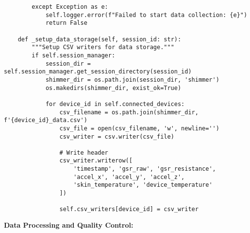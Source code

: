 \documentclass[12pt,a4paper]{article}
\begin{document}
\begin{verbatim}
        except Exception as e:
            self.logger.error(f"Failed to start data collection: {e}")
            return False
    
    def _setup_data_storage(self, session_id: str):
        """Setup CSV writers for data storage."""
        if self.session_manager:
            session_dir = self.session_manager.get_session_directory(session_id)
            shimmer_dir = os.path.join(session_dir, 'shimmer')
            os.makedirs(shimmer_dir, exist_ok=True)
            
            for device_id in self.connected_devices:
                csv_filename = os.path.join(shimmer_dir, f'{device_id}_data.csv')
                csv_file = open(csv_filename, 'w', newline='')
                csv_writer = csv.writer(csv_file)
                
                # Write header
                csv_writer.writerow([
                    'timestamp', 'gsr_raw', 'gsr_resistance', 
                    'accel_x', 'accel_y', 'accel_z',
                    'skin_temperature', 'device_temperature'
                ])
                
                self.csv_writers[device_id] = csv_writer
\end{verbatim}

\textbf{Data Processing and Quality Control:}
\end{document}
